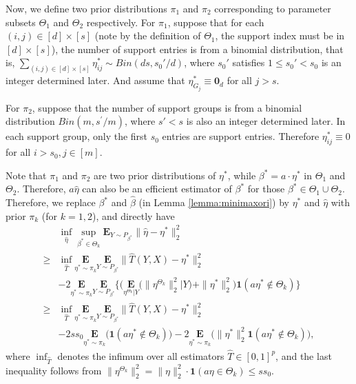 \documentclass[12pt]{article}
\begin{document}
\begin{appendix}
Now, we define two prior distributions $\pi_1$ and $\pi_2$ corresponding to parameter subsets ${\Theta}_1$ and ${\Theta}_2$ respectively.
For $\pi_1$, suppose that for each $(i,j) \in [d] \times [s]$ (note by the definition of ${\Theta}_1$, the support index must be in $[d] \times [s]$), the number of support entries is from a binomial distribution, that is, $\sum_{(i,j) \in [d] \times [s]} \eta_{ij}^* \sim Bin (ds, s_0'/d)$, where $ s_0' $ satisfies $1\le s_0' < s_0$ is an integer determined later. 
And assume that $\eta_{G_j}^* \equiv \mathbf 0_d$ for all $ j >s$.

For $\pi_2$, suppose that the number of support groups is from a binomial distribution $Bin(m, s^{\prime} / m)$, where $ s' < s$ is also an integer determined later.
In each support group, only the first $s_0$ entries are support entries. Therefore $\eta_{ij}^* \equiv 0$ for all $i > s_0, j \in [m]$.

Note that $\pi_1$ and $\pi_2$ are two prior distributions of $\eta^*$, while $\beta^* = a\cdot\eta^*$ in ${\Theta}_1$ and ${\Theta}_2$.
Therefore, $a \hat \eta$ can also be an efficient estimator of $\beta^*$ for those $\beta^* \in {\Theta}_1 \cup {\Theta}_2$.
Therefore, we replace $\beta^*$ and $\hat \beta$ (in Lemma \ref{lemma:minimaxori}) by $\eta^*$ and $\hat \eta$ with prior $\pi_k$ (for $k=1,2$), and directly have
\begin{equation}\label{eq:priork}
\begin{aligned}
&\inf_{\hat \eta} \sup_{\beta^* \in  {\Theta}_k} 
    \mathbf{E}_{Y\sim P_{\beta^*} } \|\hat \eta - \eta^*\|_2^2 \\
\ge &\inf_{\hat T } \underset{\eta^* \sim \pi_k}{\mathbf E} \underset{Y \sim P_{\beta^*} }{\mathbf E} \|\hat T(Y,X) - \eta^*\|_2^2 \\
    &-2 \underset{\eta^* \sim \pi_k}{\mathbf E} \underset{Y \sim P_{\beta^*} }{\mathbf E}  \Bigg\{ \bigg( \underset{\eta^{ {\Theta}_k}|Y}{\mathbf{E}}   \Big( \|\eta^{ {\Theta}_k} \|_2^2 \big| Y \Big) +
    \| \eta^* \|_2^2  \bigg) \mathbf1( a\eta^* \notin {\Theta}_k) \Bigg\} \\
\ge &\inf_{\hat T } \underset{\eta^* \sim \pi_k}{\mathbf E} \underset{Y \sim P_{\beta^*} }{\mathbf E}  \|\hat T(Y,X) - \eta^* \|_2^2 \\
    &-2 ss_0 \underset{\eta^* \sim \pi_k}{\mathbf E} \big( \mathbf1( a\eta^* \notin {\Theta}_k) \big) 
    -2 \underset{\eta^* \sim \pi_k}{\mathbf E} \big( \| \eta^*\|_2^2 \mathbf1( a\eta^* \notin {\Theta}_k) \big),
\end{aligned}
\end{equation}
where $\inf_{\hat T}$ denotes the infimum over all estimators $\hat T \in [0,1]^p$, and the last inequality follows from $\|\eta^{ {\Theta}_k} \|_2^2 =  \|\eta \|_2^2\cdot \mathbf1( a\eta \in  {\Theta}_k )\le ss_0$.


\end{appendix}
\end{document}
